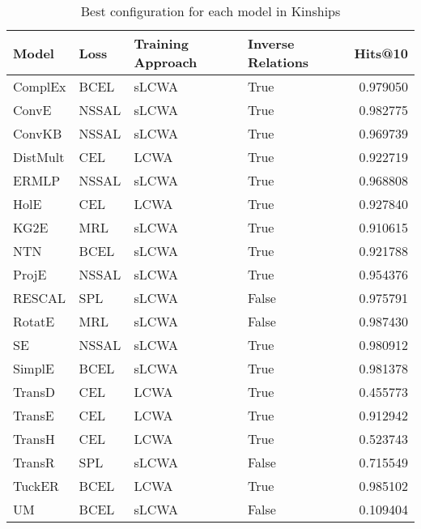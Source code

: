 \begin{table}
\centering
\caption{Best configuration for each model in Kinships}
\label{best_models_kinships}
\begin{tabular}{llllr}
\toprule
    Model &   Loss & Training Approach & Inverse Relations &   Hits@10 \\
\midrule
  ComplEx &   BCEL &             sLCWA &              True &  0.979050 \\
    ConvE &  NSSAL &             sLCWA &              True &  0.982775 \\
   ConvKB &  NSSAL &             sLCWA &              True &  0.969739 \\
 DistMult &    CEL &              LCWA &              True &  0.922719 \\
    ERMLP &  NSSAL &             sLCWA &              True &  0.968808 \\
     HolE &    CEL &              LCWA &              True &  0.927840 \\
     KG2E &    MRL &             sLCWA &              True &  0.910615 \\
      NTN &   BCEL &             sLCWA &              True &  0.921788 \\
    ProjE &  NSSAL &             sLCWA &              True &  0.954376 \\
   RESCAL &    SPL &             sLCWA &             False &  0.975791 \\
   RotatE &    MRL &             sLCWA &             False &  0.987430 \\
       SE &  NSSAL &             sLCWA &              True &  0.980912 \\
   SimplE &   BCEL &             sLCWA &              True &  0.981378 \\
   TransD &    CEL &              LCWA &              True &  0.455773 \\
   TransE &    CEL &              LCWA &              True &  0.912942 \\
   TransH &    CEL &              LCWA &              True &  0.523743 \\
   TransR &    SPL &             sLCWA &             False &  0.715549 \\
   TuckER &   BCEL &              LCWA &              True &  0.985102 \\
       UM &   BCEL &             sLCWA &             False &  0.109404 \\
\bottomrule
\end{tabular}
\end{table}

